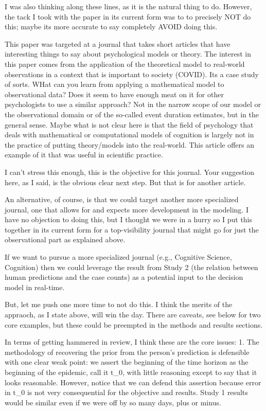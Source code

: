 
 


I was also thinking along these lines, as it is the natural thing to do.  However, the tack I took with the paper in its current form was to to precisely NOT do this; maybe its more accurate to say completely AVOID doing this.  

This paper was targeted at a journal that takes short articles that have interesting things to say about psychological models or theory.  The interest in this paper comes from the application of the theoretical model to real-world observations in a context that is important to society (COVID).  Its a case study of sorts.  WHat can you learn from applying a mathematical model to observational data?  Does it seem to have enough meat on it for other psychologists to use a similar approach? Not in the narrow scope of our model or the observational domain or of the so-called event duration estimates, but in the general sense.   Maybe what is not clear here is that the field of psychology that deals with mathematical or computational models of cognition is largely not in the practice of putting theory/models into the real-world.  This article offers an example of it that was useful in scientific practice.  

I can't stress this enough, this is the objective for this journal.  Your suggestion here, as I said, is the obvious clear next step.  But that is for another article.  

An alternative, of course, is that we could target another more specialized journal, one that allows for and expects more development in the modeling.  I have no objection to doing this, but I thought we were in a hurry so I put this together in its current form for a top-visibility journal that might go for just the observational part as explained above.  

If we want to pursue a more specialized journal (e.g., Cognitive Science, Cognition) then we could leverage the result from Study 2 (the relation between human predictions and the case counts) as a potential input to the decision model in real-time. 

But, let me push one more time to not do this.  I think the merits of the appraoch, as I state above, will win the day.  There are caveats, see below for two core examples, but these could be preempted in the methods and results sections.


In terms of getting hammered in review, I think these are the core issues:
1. The methodology of recovering the prior from the person's prediction is defensible with one clear weak point:  we assert the beginning of the time horizon as the beginning of the epidemic, call it t_0, with little reasoning except to say that it looks reasonable.  However, notice that we can defend this assertion because error in t_0 is not very consequential for the objective and results.  Study 1 results would be similar even if we were off by so many days, plus or minus.

